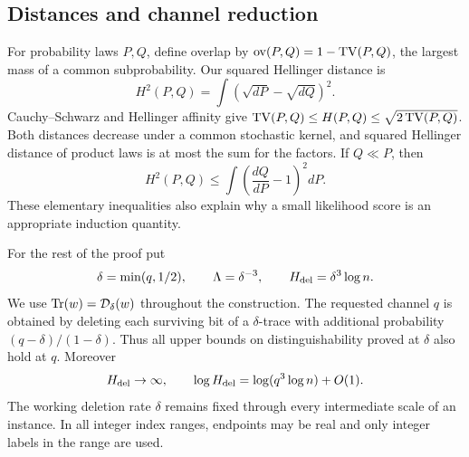 \subsection{Distances and channel reduction}

For probability laws $P,Q$, define overlap by $\operatorname{ov}(P,Q)=1-\operatorname{TV}(P,Q)$, the largest mass of a common subprobability.  Our squared Hellinger distance is
\[
 H^2(P,Q)=\int(\sqrt{dP}-\sqrt{dQ})^2.
\]
Cauchy--Schwarz and Hellinger affinity give $\operatorname{TV}(P,Q)\le H(P,Q)\le\sqrt{2\operatorname{TV}(P,Q)}$.  Both distances decrease under a common stochastic kernel, and squared Hellinger distance of product laws is at most the sum for the factors.  If $Q\ll P$, then
\[
 H^2(P,Q)\le\int\left(\frac{dQ}{dP}-1\right)^2dP.
\]
These elementary inequalities also explain why a small likelihood score is an appropriate induction quantity.

For the rest of the proof put
\[
 \delta=\min(q,1/2),\qquad \Lambda=\delta^{-3},\qquad
 H_{\rm del}=\delta^3\log n.
\]
We use $\mathrm{Tr}(w)=\mathcal D_\delta(w)$ throughout the construction.  The requested channel $q$ is obtained by deleting each surviving bit of a $\delta$-trace with additional probability $(q-\delta)/(1-\delta)$.  Thus all upper bounds on distinguishability proved at $\delta$ also hold at $q$.  Moreover
\[
 H_{\rm del}\to\infty,\qquad
 \log H_{\rm del}=\log(q^3\log n)+O(1).
\]
The working deletion rate $\delta$ remains fixed through every intermediate scale of an instance.  In all integer index ranges, endpoints may be real and only integer labels in the range are used.
